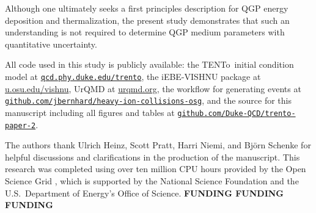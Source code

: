 \documentclass[aps,prc,reprint,amsmath,nofootinbib,superscriptaddress]{revtex4-1}
\newcommand{\trento}{T\raisebox{-0.5ex}{R}ENTo}
\begin{document}
Although one ultimately seeks a first principles description for QGP energy deposition and thermalization, the present study demonstrates that such an understanding is not required to determine QGP medium parameters with quantitative uncertainty.

\medskip

\newcommand{\nicelink}[2][http]{\mbox{\href{#1://#2}{\nolinkurl{#2}}}}

All code used in this study is publicly available:
the \trento\ initial condition model at \nicelink{qcd.phy.duke.edu/trento},
the iEBE-VISHNU package at \url{u.osu.edu/vishnu},
UrQMD at \url{urqmd.org},
the workflow for generating events at \nicelink[https]{github.com/jbernhard/heavy-ion-collisions-osg},
and the source for this manuscript including all figures and tables at \nicelink[https]{github.com/Duke-QCD/trento-paper-2}.

\begin{acknowledgments}
The authors thank Ulrich Heinz, Scott Pratt, Harri Niemi, and Bj\"orn Schenke for helpful discussions and clarifications in the production of the manuscript.
This research was completed using over ten million CPU hours provided by the Open Science Grid \cite{Pordes:2007zzb,Sfiligoi:2010zz}, which is supported by the National Science Foundation and the U.S.\ Department of Energy's Office of Science.
\textbf{FUNDING FUNDING FUNDING}
\end{acknowledgments}


\end{document}

